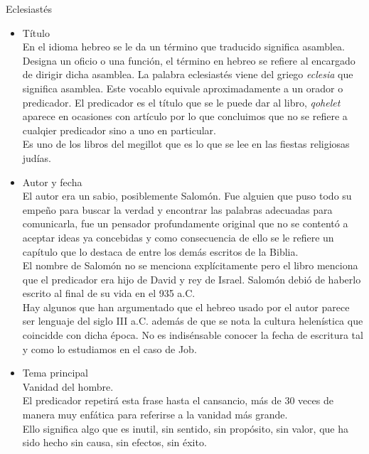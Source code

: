 %

%
\begin{section}{Eclesiastés}
	\begin{itemize}
		\item Título\\
			En el idioma hebreo se le da un término que traducido significa asamblea. Designa un oficio o una función, el término en hebreo se refiere al encargado de dirigir dicha asamblea. La palabra eclesiastés viene del griego \textit{eclesia} que significa asamblea. Este vocablo equivale aproximadamente a un orador o predicador. El predicador es el título que se le puede dar al libro, \textit{qohelet} aparece en ocasiones con artículo por lo que concluimos que no se refiere a cualqier predicador sino a uno en particular.\\
			Es uno de los libros del megillot que es lo que se lee en las fiestas religiosas judías.
		\item Autor y fecha\\
			El autor era un sabio, posiblemente Salomón. Fue alguien que puso todo su empeño para buscar la verdad y encontrar las palabras adecuadas para comunicarla, fue un pensador profundamente original que no se contentó a aceptar ideas ya concebidas y como consecuencia de ello se le refiere un capítulo que lo destaca de entre los demás escritos de la Biblia.\\
			El nombre de Salomón no se menciona explícitamente pero el libro menciona que el predicador era hijo de David y rey de Israel. Salomón debió de haberlo escrito al final de su vida en el 935 a.C.\\
			Hay algunos que han argumentado que el hebreo usado por el autor parece ser lenguaje del siglo III a.C. además de que se nota la cultura helenística que coincidde con dicha época. No es indisénsable conocer la fecha de escritura tal y como lo estudiamos en el caso de Job.
		\item Tema principal\\
			Vanidad del hombre.\\
		El predicador repetirá esta frase hasta el cansancio, más de 30 veces de manera muy enfática para referirse a la vanidad más grande.\\
		Ello significa algo que es inutil, sin sentido, sin propósito, sin valor, que ha sido hecho sin causa, sin efectos, sin éxito.\\

\end{itemize}
\end{section}
